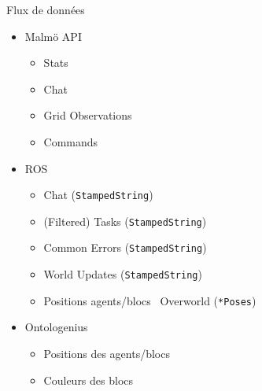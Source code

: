 \documentclass[aspectratio=169]{audition-beamer}
\begin{document}
\begin{frame}{Flux de données}

  \vfill
  \vfill
  \begin{itemize}
    \item Malmö API 
          \begin{itemize}[<.(2)->]
            \item Stats
            \item Chat
            \item Grid Observations
            \item Commands
          \end{itemize}
    \item ROS
          \begin{itemize}[<.(3)->]
            \item Chat (\texttt{StampedString})
            \item (Filtered) Tasks (\texttt{StampedString})
            \item Common Errors (\texttt{StampedString})
            \item World Updates (\texttt{StampedString})
            \item Positions agents/blocs \textrightarrow\ Overworld (\texttt{*Poses})
          \end{itemize}
    \item Ontologenius
          \begin{itemize}[<.(4)->]
            \item Positions des agents/blocs 
            \item Couleurs des blocs 
          \end{itemize}
  \end{itemize}

\end{frame}
\end{document}
